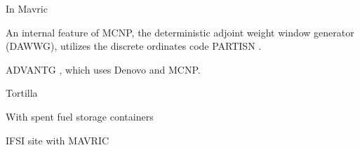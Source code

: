 In Mavric \cite{peplow_advanced_2007}

An internal feature of MCNP, the deterministic adjoint weight window generator (DAWWG), utilizes the discrete ordinates code PARTISN \cite{sweezy_automated_2005}.

ADVANTG \cite{mosher_new_2010, wagner_review_2011, bevill_new_2012}, which uses Denovo \cite{evans_denovo:_2010-1} and MCNP.

Tortilla \cite{somasundaram_implementation_2013}

With spent fuel storage containers \cite{chen_surface_2011}

IFSI site with MAVRIC \cite{sheu_dose_2011}


